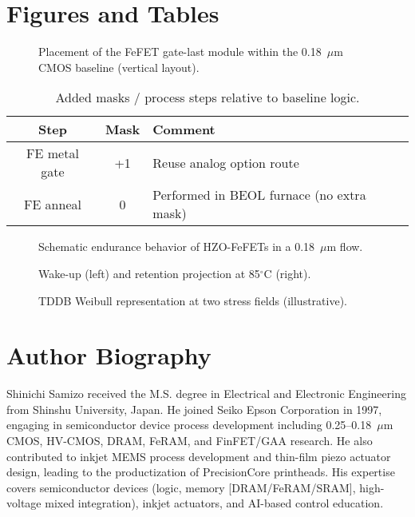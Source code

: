 \documentclass[conference]{IEEEtran}
\begin{document}
\clearpage
\onecolumn
\section*{Figures and Tables}

\begin{figure*}[t]
  \centering
  \caption{Placement of the FeFET gate-last module within the 0.18~$\mu$m CMOS baseline (vertical layout).}
  \label{fig:flow}
\end{figure*}

\begin{table*}[t]
\centering
\caption{Added masks / process steps relative to baseline logic.}
\label{tab:masks}
\begin{tabular}{|c|c|l|}
\hline
Step & Mask & Comment \\
\hline
FE metal gate & +1 & Reuse analog option route \\
FE anneal     & 0  & Performed in BEOL furnace (no extra mask) \\
\hline
\end{tabular}
\end{table*}

\begin{figure*}[t]
  \centering
  
  \caption{Schematic endurance behavior of HZO-FeFETs in a 0.18~$\mu$m flow.}
  \label{fig:endurance}
\end{figure*}

\begin{figure*}[t]
  \centering
  \hfill
  
  \caption{Wake-up (left) and retention projection at 85$^\circ$C (right).}
  \label{fig:wakeup}
\end{figure*}

\begin{figure*}[t]
  \centering
  
  \caption{TDDB Weibull representation at two stress fields (illustrative).}
  \label{fig:tddb}
\end{figure*}

\clearpage
\twocolumn

\section*{Author Biography}
Shinichi Samizo received the M.S. degree in Electrical and Electronic Engineering from Shinshu University, Japan. He joined Seiko Epson Corporation in 1997, engaging in semiconductor device process development including 0.25--0.18~$\mu$m CMOS, HV-CMOS, DRAM, FeRAM, and FinFET/GAA research. He also contributed to inkjet MEMS process development and thin-film piezo actuator design, leading to the productization of PrecisionCore printheads. His expertise covers semiconductor devices (logic, memory [DRAM/FeRAM/SRAM], high-voltage mixed integration), inkjet actuators, and AI-based control education.
\end{document}
